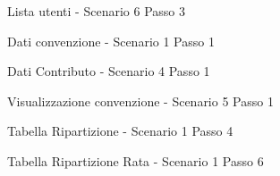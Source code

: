 \begin{figure}
	\centering
	\caption{Lista utenti - Scenario 6 Passo 3}
	\label{ListaUtenti}
\end{figure}

\begin{figure}
	\centering
	\caption{Dati convenzione - Scenario 1 Passo 1}
	\label{tabDati}
\end{figure}

\begin{figure}
	\centering
	\caption{Dati Contributo - Scenario 4 Passo 1}
	\label{tabDatiContributo}
\end{figure}

\begin{figure}
	\centering
	\caption{Visualizzazione convenzione - Scenario 5 Passo 1}
	\label{tabDatiVisualizzazione}
\end{figure}

\begin{figure}
	\centering
	\caption{Tabella Ripartizione - Scenario 1 Passo 4}
	\label{tabRip}
\end{figure}

\begin{figure}
	\centering
	\caption{Tabella Ripartizione Rata - Scenario 1 Passo 6}
	\label{tabRipRata}
\end{figure}